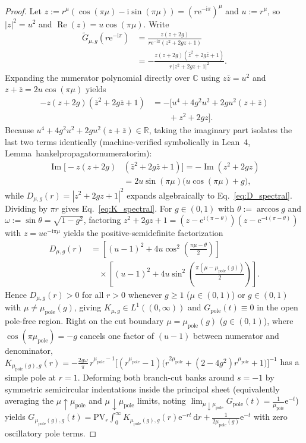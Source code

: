 \documentclass[twocolumn,10pt,amsmath,amssymb,floatfix]{revtex4-2}
\theoremstyle{plain}
\theoremstyle{definition}
\newcommand{\dd}{\mathrm{d}}
\newcommand{\ii}{\mathrm{i}}
\newcommand{\ee}{\mathrm{e}}
\newcommand{\mupole}{\mu_{\mathrm{pole}}}
\newcommand{\leanid}[1]{{\footnotesize\ttfamily\def\_{\textunderscore\penalty0\hspace{0pt}}#1}}
\begin{document}
\begin{proof}
Let $z := r^\mu(\cos(\pi\mu) - \ii\sin(\pi\mu)) = (r\ee^{-\ii\pi})^\mu$ and $u := r^\mu$, so $|z|^2 = u^2$ and $\operatorname{Re}(z) = u\cos(\pi\mu)$. Write
\begin{align*}
\tilde{G}_{\mu,g}(r\ee^{-\ii\pi}) &= \frac{z(z+2g)}{r\ee^{-\ii\pi}(z^2 + 2gz + 1)} \\
&= -\frac{z(z+2g)(\bar{z}^2 + 2g\bar{z} + 1)}{r\,|z^2 + 2gz + 1|^2}.
\end{align*}
Expanding the numerator polynomial directly over $\mathbb{C}$ using $z\bar{z} = u^2$ and $z + \bar{z} = 2u\cos(\pi\mu)$ yields
\begin{align*}
-z(z+2g)(\bar{z}^2 + 2g\bar{z} + 1)
&= -\big[u^4 + 4g^2 u^2 + 2g u^2(z + \bar{z}) \\
&\qquad + z^2 + 2gz\big].
\end{align*}
Because $u^4 + 4g^2 u^2 + 2gu^2(z+\bar{z}) \in \mathbb{R}$, taking the imaginary part isolates the last two terms identically (machine-verified symbolically in Lean~4, Lemma~\leanid{hankel\_propagator\_numerator\_im}):
\begin{align}
\label{eq:im_exact_step}
\operatorname{Im}\big[-z(z+2g)&(\bar{z}^2 + 2g\bar{z} + 1)\big]
= -\operatorname{Im}(z^2 + 2gz) \nonumber\\
&= 2u\sin(\pi\mu)\big(u\cos(\pi\mu) + g\big),
\end{align}
while $D_{\mu,g}(r) = |z^2 + 2gz + 1|^2$ expands algebraically to Eq.~\eqref{eq:D_spectral}. Dividing by $\pi r$ gives Eq.~\eqref{eq:K_spectral}. For $g \in (0,1)$ with $\theta := \arccos g$ and $\omega := \sin\theta = \sqrt{1-g^2}$, factoring $z^2 + 2gz + 1 = (z - \ee^{\ii(\pi-\theta)})(z - \ee^{-\ii(\pi-\theta)})$ with $z = u\ee^{-\ii\pi\mu}$ yields the positive-semidefinite factorization
\begin{align}
\label{eq:D_factored}
D_{\mu,g}(r) &= \left[(u - 1)^2 + 4u\cos^2\!\left(\frac{\pi\mu - \theta}{2}\right)\right] \nonumber\\
&\quad \times \left[(u - 1)^2 + 4u\sin^2\!\left(\frac{\pi(\mu - \mupole(g))}{2}\right)\right].
\end{align}
Hence $D_{\mu,g}(r) > 0$ for all $r > 0$ whenever $g \ge 1$ ($\mu \in (0,1)$) or $g \in (0,1)$ with $\mu \neq \mupole(g)$, giving $K_{\mu,g} \in L^1((0,\infty))$ and $G_{\mathrm{pole}}(t) \equiv 0$ in the open pole-free region. Right on the cut boundary $\mu = \mupole(g)$ ($g \in (0,1)$), where $\cos(\pi\mupole) = -g$ cancels one factor of $(u-1)$ between numerator and denominator, $K_{\mupole(g),g}(r) = -\frac{2g\omega}{\pi}\,r^{\mupole-1}\big[(r^{\mupole}-1)\big(r^{2\mupole} + (2-4g^2)r^{\mupole} + 1\big)\big]^{-1}$ has a simple pole at $r = 1$. Deforming both branch-cut banks around $s = -1$ by symmetric semicircular indentations inside the principal sheet (equivalently averaging the $\mu \uparrow \mupole$ and $\mu \downarrow \mupole$ limits, noting $\lim_{\mu \downarrow \mupole} G_{\mathrm{pole}}(t) = \frac{1}{\mupole}\ee^{-t}$) yields $G_{\mupole(g),g}(t) = \mathrm{PV}_r\!\int_0^\infty K_{\mupole(g),g}(r)\ee^{-rt}\,\dd r + \frac{1}{2\mupole(g)}\ee^{-t}$ with zero oscillatory pole terms.


\end{proof}
\end{document}
